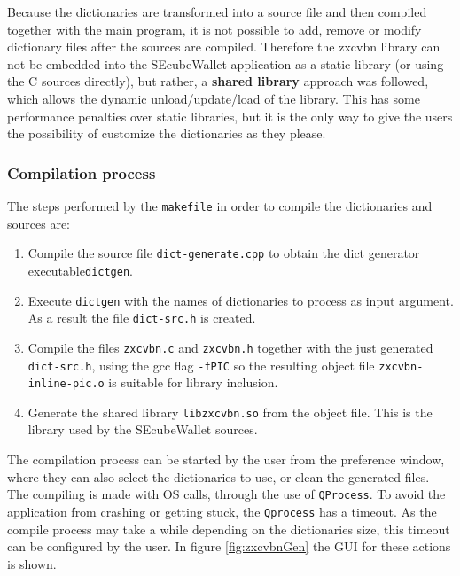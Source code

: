 Because the dictionaries are transformed into a source file and then compiled together with the main program, it is not possible to add, remove or modify dictionary files after the sources are compiled. Therefore the zxcvbn library can not be embedded into the SEcubeWallet application as a static library (or using the C sources directly), but rather, a \textbf{shared library} approach was followed, which allows the dynamic unload/update/load of the library. This has some performance penalties over static libraries, but it is the only way to give the users the possibility of customize the dictionaries as they please.

\subsubsection*{Compilation process}

The steps performed by the \texttt{makefile} in order to compile the dictionaries and sources are:

\begin{enumerate}
\setlength\itemsep{0pt}
\item Compile the source file \texttt{dict-generate.cpp} to obtain the dict generator executable\texttt{dictgen}.
\item Execute \texttt{dictgen} with the names of dictionaries to process as input argument. As a result the file \texttt{dict-src.h} is created.
\item Compile the files \texttt{zxcvbn.c} and \texttt{zxcvbn.h} together with the just generated \texttt{dict-src.h}, using the gcc flag \texttt{-fPIC} so the resulting object file \texttt{zxcvbn-inline-pic.o} is suitable for library inclusion.
\item Generate the shared library \texttt{libzxcvbn.so} from the object file. This is the library used by the SEcubeWallet sources.
\end{enumerate}

The compilation process can be started by the user from the preference window, where they can also select the dictionaries to use, or clean the generated files. The compiling is made with OS calls, through the use of \texttt{QProcess}. To avoid the application from crashing or getting stuck, the \texttt{Qprocess} has a timeout. As the compile process may take a while depending on the dictionaries size, this timeout can be configured by the user. In figure \ref{fig:zxcvbnGen} the GUI for these actions is shown.

